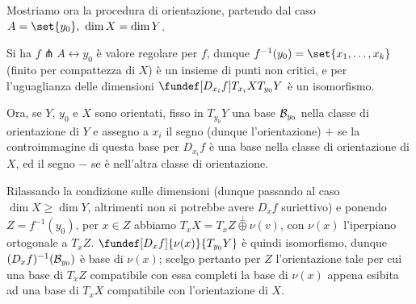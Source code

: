 Mostriamo ora la procedura di orientazione, partendo dal caso $A = \set{y_0}, \ \dim X = \dim Y$.

Si ha $f \pitchfork A \leftrightarrow y_0$ è valore regolare per $f$, dunque $f^{-1}(y_0) = \set{x_1, \dots , x_k}$ (finito per compattezza di $X$) è un insieme di punti non critici, e per l'uguaglianza delle dimensioni $\fundef[D_{x_i}f]{T_{x_i} X}{T_{y_0} Y}$ è un isomorfismo.

Ora, se $Y$, $y_0$ e $X$ sono orientati, fisso in $T_{y_0} Y$ una base $\mathcal{B}_{y_0}$ nella classe di orientazione di $Y$ e assegno a $x_i$ il segno (dunque l'orientazione) $+$ se la controimmagine di questa base per $D_{x_i}f$ è una base nella classe di orientazione di $X$, ed il segno $-$ se è nell'altra classe di orientazione.

Rilassando la condizione sulle dimensioni (dunque passando al caso $\dim X \ge \dim Y$, altrimenti non si potrebbe avere $D_x f$ suriettivo) e ponendo $Z = f^{-1}(y_0)$, per $x \in Z$ abbiamo $T_x X = T_x Z \overset{\perp}{\oplus} \nu(v)$, con $\nu(x)$ l'iperpiano ortogonale a $T_x Z$. $\fundef[D_x f]{\nu(x)}{T_{y_0} Y}$ è quindi isomorfismo, dunque $(D_x f)^{-1}(\mathcal{B}_{y_0})$ è base di $\nu(x)$; scelgo pertanto per $Z$ l'orientazione tale per cui una base di $T_x Z$ compatibile con essa completi la base di $\nu(x)$ appena esibita ad una base di $T_x X$ compatibile con l'orientazione di $X$. 
